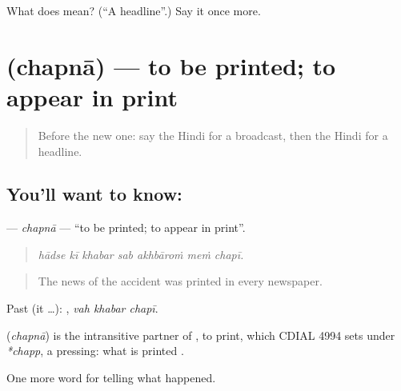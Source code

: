 \begin{tcolorbox}[breakable,colback=teal!4,colframe=teal!35!black,title={Before you move on}]
What does  mean? (\textquotedblleft{}A headline\textquotedblright{}.) Say it once more.
\end{tcolorbox}
\section[\texorpdfstring{\hi{छपना} (chapnā)}{छपना (chapnā)}]{ (chapnā) — to be printed; to appear in print}

\label{lesson:HI-C312-chapna}



\begin{quote}
Before the new one: say the Hindi for a broadcast, then the Hindi for a headline.
\end{quote}

\subsection*{You'll want to know: }
\textbf{} — \emph{chapnā} — \textquotedblleft{}to be printed; to appear in print\textquotedblright{}.

\begin{quote}
      
\end{quote}

\begin{quote}
\emph{hādse kī khabar sab akhbāroṁ meṁ chapī.}
\end{quote}

\begin{quote}
The news of the accident was printed in every newspaper.
\end{quote}

Past (it …):   , \emph{vah khabar chapī}.

\begin{cousinweb}
\textbf{} (\emph{chapnā}) is the intransitive partner of \textbf{}, to print, which CDIAL 4994 sets under \emph{*chapp}, a pressing: what is printed \textbf{ }.
\end{cousinweb}

\begin{grammarlens}[title={What you've built}]
One more word for telling what happened.
\end{grammarlens}

